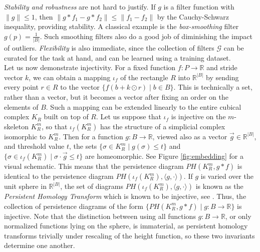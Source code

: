 \documentclass[12pt]{amsart}
\numberwithin{figure}{section}
\begin{document}
\emph{Stability and robustness} are not hard to justify. If $g$ is a filter function with $\|g\| \leq 1$, then $\|g \ast f_1 - g \ast f_2 \| \leq \|f_1 - f_2\|$ by the Cauchy-Schwarz inequality, providing stability. A classical example is the \emph{box-smoothing} filter $g(p) = \frac{1}{|B|}$. Such smoothing filters also do a good job of diminishing the impact of outliers. \emph{Flexibility} is also immediate, since the collection of filters $\mathcal{G}$ can be curated for the task at hand, and can be learned using a training dataset.\\

Let us now demonstrate injectivity. For a fixed function $f:P \to \mathbb{R}$ and stride vector $k$, we can obtain a mapping $\iota_{f}$ of the rectangle $R$ into $\mathbb{R}^{|B|}$ by sending every point $r \in R$ to the vector $\{f(b + k \odot r) \mid b \in B\}$. This is technically a set, rather than a vector, but it becomes a vector after fixing an order on the elements of $B$. Such a mapping can be extended linearly to the entire cubical complex $K_{R}$ built on top of $R$. Let us suppose that $\iota_{f}$ is injective on the $m$-skeleton $K_{R}^m$, so that $\iota_{f}(K_{R}^m)$ has the structure of a simplicial complex isomorphic to $K_{R}^m$. Then for a function $g: B \to \mathbb{R}$, viewed also as a vector $\vec{g} \in \mathbb{R}^{|B|}$, and threshold value $t$, the sets $\{\sigma \in K_{R}^{m} \mid g(\sigma) \leq t\}$ and $\{\sigma \in \iota_{f}(K_{R}^m) \mid \sigma \cdot \vec{g} \leq t \}$ are homeomorphic. See Figure \ref{fig:embedding} for a visual schematic. This means that the persistence diagram $PH(K_{R}^m,g \ast f)$ is identical to the persistence diagram $PH(\iota_{f}(K_{R}^m),\langle g, \cdot \rangle)$. If $g$ is varied over the unit sphere in $\mathbb{R}^{|B|}$, the set of diagrams $PH(\iota_{f}(K_{R}^m),\langle g, \cdot \rangle)$ is known as the \emph{Persistent Homology Transform} which is known to be injective, see \cite{turner2014persistent,ghrist2018persistent,curry2018many}. Thus, the collection of persistence diagrams of the form $\{PH(K_{R}^m, g \ast f) \mid g : B \to \mathbb{R}\}$ is injective. Note that the distinction between using all functions $g: B \to \mathbb{R}$, or only normalized functions lying on the sphere, is immaterial, as persistent homology transforms trivially under rescaling of the height function, so these two invariants determine one another.\\ 
\end{document}
